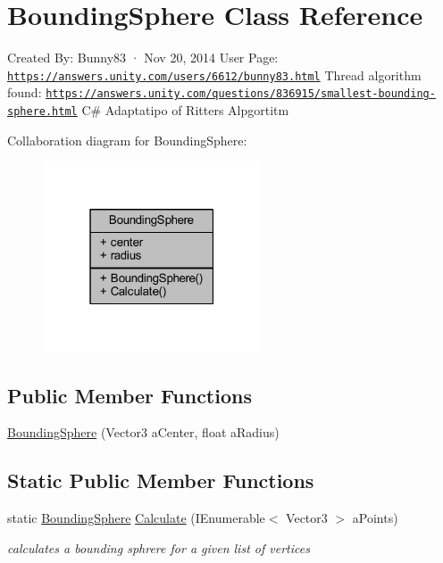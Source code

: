 \hypertarget{class_bounding_sphere}{}\section{Bounding\+Sphere Class Reference}
\label{class_bounding_sphere}


Created By\+: Bunny83 · Nov 20, 2014 User Page\+: \href{https://answers.unity.com/users/6612/bunny83.html}{\tt https\+://answers.\+unity.\+com/users/6612/bunny83.\+html} Thread algorithm found\+: \href{https://answers.unity.com/questions/836915/smallest-bounding-sphere.html}{\tt https\+://answers.\+unity.\+com/questions/836915/smallest-\/bounding-\/sphere.\+html} C\# Adaptatipo of Ritters Alpgortitm  




Collaboration diagram for Bounding\+Sphere\+:\nopagebreak
\begin{figure}[H]
\begin{center}
\leavevmode
\includegraphics[width=183pt]{class_bounding_sphere__coll__graph}
\end{center}
\end{figure}
\subsection*{Public Member Functions}
\begin{DoxyCompactItemize}
\item 
\mbox{\hyperlink{class_bounding_sphere_ad35e7960a2e532e8f7cbebbca2136ef7}{Bounding\+Sphere}} (Vector3 a\+Center, float a\+Radius)
\end{DoxyCompactItemize}
\subsection*{Static Public Member Functions}
\begin{DoxyCompactItemize}
\item 
static \mbox{\hyperlink{class_bounding_sphere}{Bounding\+Sphere}} \mbox{\hyperlink{class_bounding_sphere_a29c277d13a701089666b94fabf3c87d6}{Calculate}} (I\+Enumerable$<$ Vector3 $>$ a\+Points)
\begin{DoxyCompactList}\small\item\em calculates a bounding sphrere for a given list of vertices \end{DoxyCompactList}\end{DoxyCompactItemize}
